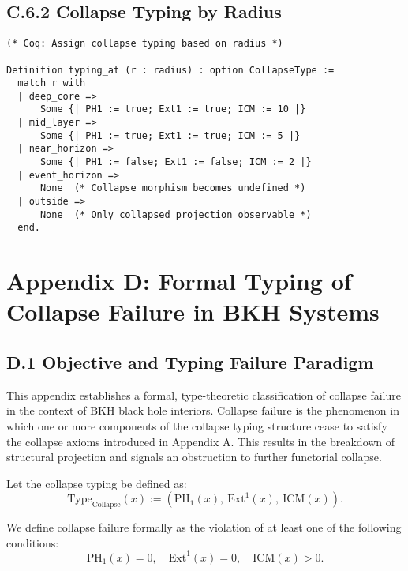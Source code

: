 \documentclass[11pt]{article}
\begin{document}
\subsection*{C.6.2 Collapse Typing by Radius}

\begin{lstlisting}
(* Coq: Assign collapse typing based on radius *)

Definition typing_at (r : radius) : option CollapseType :=
  match r with
  | deep_core =>
      Some {| PH1 := true; Ext1 := true; ICM := 10 |}
  | mid_layer =>
      Some {| PH1 := true; Ext1 := true; ICM := 5 |}
  | near_horizon =>
      Some {| PH1 := false; Ext1 := false; ICM := 2 |}
  | event_horizon =>
      None  (* Collapse morphism becomes undefined *)
  | outside =>
      None  (* Only collapsed projection observable *)
  end.
\end{lstlisting}



\section*{Appendix D: Formal Typing of Collapse Failure in BKH Systems}

\subsection*{D.1 Objective and Typing Failure Paradigm}

This appendix establishes a formal, type-theoretic classification of collapse failure in the context of BKH black hole interiors. Collapse failure is the phenomenon in which one or more components of the collapse typing structure cease to satisfy the collapse axioms introduced in Appendix A. This results in the breakdown of structural projection and signals an obstruction to further functorial collapse.

Let the collapse typing be defined as:
\[
\mathrm{Type}_{\mathrm{Collapse}}(x) := \left( \mathrm{PH}_1(x),\ \mathrm{Ext}^1(x),\ \mathrm{ICM}(x) \right).
\]

We define collapse failure formally as the violation of at least one of the following conditions:
\[
\mathrm{PH}_1(x) = 0,\quad \mathrm{Ext}^1(x) = 0,\quad \mathrm{ICM}(x) > 0.
\]
\end{document}
